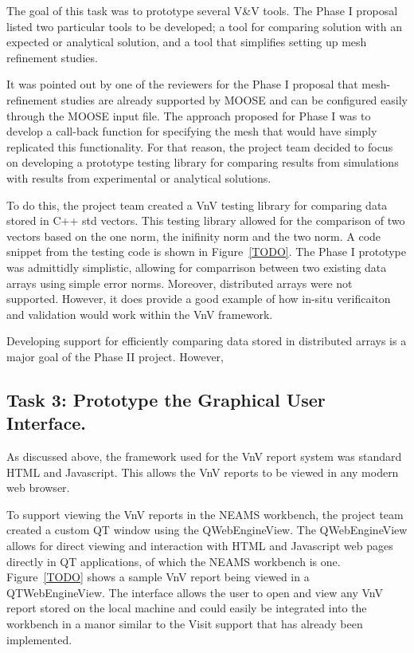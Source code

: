 The goal of this task was to prototype several V&V tools. The Phase I proposal listed two particular tools to be developed; a tool 
for comparing solution with an expected or analytical solution, and a tool that simplifies setting up mesh refinement studies. 

It was pointed out by one of the reviewers for the Phase I proposal that mesh-refinement studies are already supported by MOOSE and can be configured 
easily through the MOOSE input file. The approach proposed for Phase I was to develop a call-back function for specifying the mesh that would have simply
replicated this functionality. For that reason, the project team decided to focus on developing a prototype testing library for comparing results from simulations
with results from experimental or analytical solutions. 

To do this, the project team created a VnV testing library for comparing data stored in C++ std vectors. This testing library
allowed for the comparison of two vectors based on the one norm, the inifinity norm and the two norm. A code snippet from the testing 
code is shown in Figure~\ref{TODO}. The Phase I prototype was admittidly simplistic, allowing for comparrison between two existing data arrays using simple error norms. Moreover, distributed arrays were not supported. However, it does provide a good example of how in-situ verificaiton and validation would work within the VnV framework. 

Developing support for efficiently comparing data stored in distributed arrays is a major goal of the Phase II project. However, 

\subsection{Task 3: Prototype the Graphical User Interface. }

As discussed above, the framework used for the VnV report system was standard HTML and Javascript. This allows the VnV reports to be viewed in any modern web browser.

To support viewing the VnV reports in the NEAMS workbench, the project team created a custom QT window using the QWebEngineView. The QWebEngineView allows for direct viewing and interaction with HTML and Javascript web pages directly in QT applications, of which the NEAMS workbench is one. Figure~\ref{TODO} shows a sample VnV report being viewed in a QTWebEngineView. The interface allows the user to open and view any VnV report stored on the local machine and could easily be integrated into the workbench in a manor similar to the Visit support that has already been implemented. 


